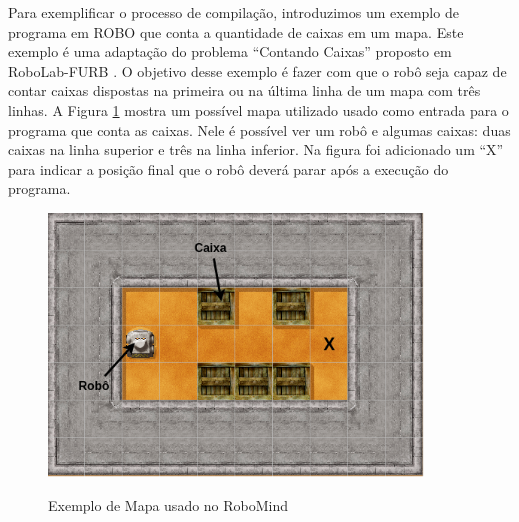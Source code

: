 Para exemplificar o processo de compilação, introduzimos um exemplo de programa em ROBO que conta a quantidade de caixas em um mapa. Este exemplo é uma adaptação do problema ``Contando Caixas'' proposto em RoboLab-FURB \cite{furb}. O objetivo desse exemplo é fazer com que o robô seja capaz de contar caixas dispostas na primeira ou na última linha de um mapa com três linhas.  A Figura \ref{fig:map} mostra um possível mapa utilizado usado como entrada para o programa que conta as caixas. Nele é possível ver um robô e algumas caixas: duas caixas na linha superior e três na linha inferior. Na figura foi adicionado um ``X'' para indicar a posição final que o robô deverá parar após a execução do programa. 

\begin{figure}[h]
\centering
\caption{Exemplo de Mapa usado no RoboMind}
\includegraphics[height=7cm]{figuras/map2.png}
\label{fig:map}
\end{figure}

